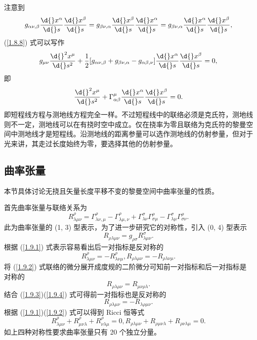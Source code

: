 \documentclass[UTF8, 12pt, a4paper, oneside, onecolumn, fontset=none]{ctexart}
\begin{document}
注意到
\begin{equation}
g_{\alpha\nu,\beta}\frac{\d{}x^{\alpha}}{\d{}s}\frac{\d{}x^{\beta}}{\d{}s}=g_{\beta\nu,\alpha}\frac{\d{}x^{\beta}}{\d{}s}\frac{\d{}x^{\alpha}}{\d{}s}=g_{\beta\nu,\alpha}\frac{\d{}x^{\alpha}}{\d{}s}\frac{\d{}x^{\beta}}{\d{}s},
\end{equation}
(\ref{1.8.8}) 式可以写作
\begin{equation}
g_{\mu\nu}\frac{\d{}^{2}x^{\mu}}{\d{}s^{2}}+\frac{1}{2}\mleft[g_{\alpha\nu,\beta}+g_{\beta\nu,\alpha}-g_{\alpha\beta,\nu}\mright]\frac{\d{}x^{\alpha}}{\d{}s}\frac{\d{}x^{\beta}}{\d{}s}=0,
\end{equation}
即
\begin{equation}
\frac{\d{}^{2}x^{\mu}}{\d{}s^{2}}+\Gamma_{\alpha\beta}^{\mu}\frac{\d{}x^{\alpha}}{\d{}s}\frac{\d{}x^{\beta}}{\d{}s}=0.
\end{equation}
即短程线方程与测地线方程完全一样。不过短程线中的联络必须是克氏符，测地线则不一定，测地线可以在有挠时空中成立。仅在挠率为零且联络为克氏符的黎曼空间中测地线才是短程线。沿测地线的距离参量可以选作测地线的仿射参量，但对于光来讲，其走过长度始终为零，要选择其他的仿射参量。

\subsection{曲率张量}
本节具体讨论无挠且矢量长度平移不变的黎曼空间中曲率张量的性质。

首先曲率张量与联络关系为
\begin{equation}
R_{\lambda\mu\nu}^{\rho}=\Gamma_{\lambda\nu,\mu}^{\rho}-\Gamma_{\lambda\mu,\nu}^{\rho}+\Gamma_{\lambda\nu}^{\sigma}\Gamma_{\sigma\mu}^{\rho}-\Gamma_{\lambda\mu}^{\sigma}\Gamma_{\sigma\nu}^{\rho}.\label{1.9.1}
\end{equation}
此为曲率张量的 (1, 3) 型表示，为了进一步研究它的对称性，引入 (0, 4) 型表示
\begin{equation}
R_{\rho\lambda\mu\nu}=g_{\rho\sigma}R^{\sigma}_{\lambda\mu\nu}.\label{1.9.2}
\end{equation}
根据 (\ref{1.9.1}) 式表示容易看出后一对指标是反对称的
\begin{equation}
R_{\lambda\mu\nu}^{\rho}=-R_{\lambda\nu\mu}^{\rho}, R_{\rho\lambda\mu\nu}=-R_{\rho\lambda\nu\mu}.\label{1.9.3}
\end{equation}
将 (\ref{1.9.2}) 式联络的微分展开成度规的二阶微分可知前一对指标和后一对指标是对称的
\begin{equation}
R_{\rho\lambda\mu\nu}=R_{\mu\nu\rho\lambda}.\label{1.9.4}
\end{equation}
结合 (\ref{1.9.3})(\ref{1.9.4}) 式可得前一对指标也是反对称的
\begin{equation}
R_{\rho\lambda\mu\nu}=-R_{\lambda\rho\mu\nu}.
\end{equation}
根据 (\ref{1.9.1})(\ref{1.9.2}) 式可以得到 Ricci 恒等式
\begin{equation}
R_{\lambda\mu\nu}^{\rho}+R_{\mu\nu\lambda}^{\rho}+R_{\nu\lambda\mu}^{\rho}=0, R_{\rho\lambda\mu\nu}+R_{\rho\mu\nu\lambda}+R_{\rho\nu\lambda\mu}=0.
\end{equation}
如上四种对称性要求曲率张量只有 20 个独立分量。
\end{document}
